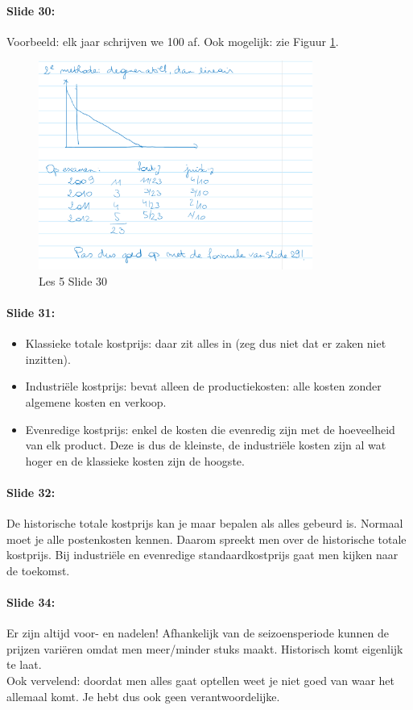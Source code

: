 \documentclass[10pt,a4paper]{report}
\begin{document}
\paragraph{Slide 30:} Voorbeeld: elk jaar schrijven we 100 af. Ook mogelijk: zie Figuur \ref{les05_08}.

\begin{figure}[h!]
\centering
\includegraphics[width=90mm]{Les05_08.png}
\caption{Les 5 Slide 30} 
\label{les05_08}
\end{figure}

\paragraph{Slide 31:}
\begin{itemize}
\item Klassieke totale kostprijs: daar zit alles in (zeg dus niet dat er zaken niet inzitten).
\item Industri\"ele kostprijs: bevat alleen de productiekosten: alle kosten zonder algemene kosten en verkoop.
\item Evenredige kostprijs: enkel de kosten die evenredig zijn met de hoeveelheid van elk product. Deze is dus de kleinste, de industri\"ele kosten zijn al wat hoger en de klassieke kosten zijn de hoogste.
\end{itemize}

\paragraph{Slide 32:} De historische totale kostprijs kan je maar bepalen als alles gebeurd is. Normaal moet je alle postenkosten kennen. Daarom spreekt men over de historische totale kostprijs. Bij industri\"ele en evenredige standaardkostprijs gaat men kijken naar de toekomst.

\paragraph{Slide 34:} Er zijn altijd voor- en nadelen! Afhankelijk van de seizoensperiode kunnen de prijzen vari\"eren omdat men meer/minder stuks maakt. Historisch komt eigenlijk te laat.\\
Ook vervelend: doordat men alles gaat optellen weet je niet goed van waar het allemaal komt. Je hebt dus ook geen verantwoordelijke.
\end{document}
